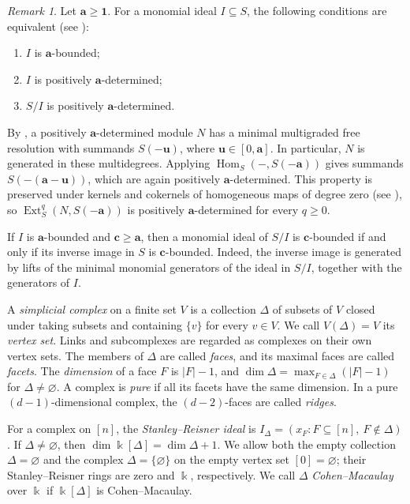 \documentclass[a4paper,11pt]{amsart}
\theoremstyle{plain}
\theoremstyle{definition}
\theoremstyle{remark}
\newtheorem{remark}[theorem]{Remark}
\DeclareMathOperator{\Hom}{Hom}
\DeclareMathOperator{\Ext}{Ext}
\newcommand{\kk}{\Bbbk}
\newcommand{\one}{\mathbf1}
\begin{document}
\begin{remark}\label{rem:positively-determined}
Let $\mathbf{a}\geq\one$. For a monomial ideal $I\subseteq S$, the following conditions are equivalent (see \cite[Example~2.4]{Mil00}):
\begin{enumerate}[label=\textup{(\roman*)}]
\item $I$ is $\mathbf{a}$-bounded;
\item $I$ is positively $\mathbf{a}$-determined;
\item $S/I$ is positively $\mathbf{a}$-determined.
\end{enumerate}
By \cite[Corollary~4.6]{Mil00}, a positively $\mathbf{a}$-determined module $N$ has a minimal multigraded free resolution with summands $S(-\mathbf{u})$, where $\mathbf{u}\in[0,\mathbf{a}]$. In particular, $N$ is generated in these multidegrees. Applying $\Hom_S(-,S(-\mathbf{a}))$ gives summands $S(-(\mathbf{a}-\mathbf{u}))$, which are again positively $\mathbf{a}$-determined. This property is preserved under kernels and cokernels of homogeneous maps of degree zero (see \cite[Remark~2.3]{Mil00}), so $\Ext_S^q(N,S(-\mathbf{a}))$ is positively $\mathbf{a}$-determined for every $q\geq0$.

If $I$ is $\mathbf{a}$-bounded and $\mathbf{c}\geq\mathbf{a}$, then a monomial ideal of $S/I$ is $\mathbf{c}$-bounded if and only if its inverse image in $S$ is $\mathbf{c}$-bounded. Indeed, the inverse image is generated by lifts of the minimal monomial generators of the ideal in $S/I$, together with the generators of $I$.
\end{remark}

A \emph{simplicial complex} on a finite set $V$ is a collection $\Delta$ of subsets of $V$ closed under taking subsets and containing $\{v\}$ for every $v\in V$. We call $V(\Delta)=V$ its \emph{vertex set}. Links and subcomplexes are regarded as complexes on their own vertex sets. The members of $\Delta$ are called \emph{faces}, and its maximal faces are called \emph{facets}. The \emph{dimension} of a face $F$ is $|F|-1$, and $\dim\Delta=\max_{F\in\Delta}(|F|-1)$ for $\Delta\ne\varnothing$. A complex is \emph{pure} if all its facets have the same dimension. In a pure $(d-1)$-dimensional complex, the $(d-2)$-faces are called \emph{ridges}.

For a complex on $[n]$, the \emph{Stanley--Reisner ideal} is $I_\Delta=(x_F:F\subseteq[n],\ F\notin\Delta)$. If $\Delta\ne\varnothing$, then $\dim\kk[\Delta]=\dim\Delta+1$. We allow both the empty collection $\Delta=\varnothing$ and the complex $\Delta=\{\varnothing\}$ on the empty vertex set $[0]=\varnothing$; their Stanley--Reisner rings are zero and $\kk$, respectively. We call $\Delta$ \emph{Cohen--Macaulay} over $\kk$ if $\kk[\Delta]$ is Cohen--Macaulay.
\end{document}

